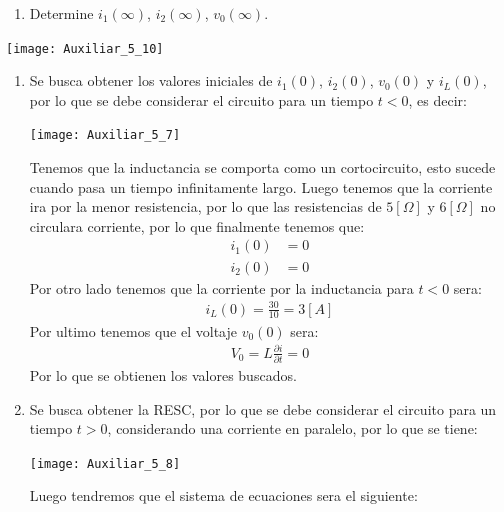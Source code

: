 \documentclass[
  11pt,
  letterpaper,
   addpoints,
   answers
  ]{exam}
\begin{document}
\begin{questions}
\begin{enumerate}
    \item Determine \( i_1(\infty) \), \( i_2(\infty) \), \( v_0(\infty) \).
\end{enumerate}
\begin{center}
    \texttt{[image: Auxiliar\_5\_10]}
\end{center}
\begin{solution}
    \begin{enumerate}
        \item Se busca obtener los valores iniciales de $i_{1}(0)$, $i_{2}(0)$, $v_{0}(0)$ y $i_{L}(0)$, por lo que se debe considerar el circuito para un tiempo $t<0$, es decir:
        \begin{center}
            \texttt{[image: Auxiliar\_5\_7]}
        \end{center}
        Tenemos que la inductancia se comporta como un cortocircuito, esto sucede cuando pasa un tiempo infinitamente largo. Luego tenemos que la corriente ira por la menor resistencia, por lo que las resistencias de $5[\Omega]$ y $6[\Omega]$ no circulara corriente, por lo que finalmente tenemos que:
        \begin{align}
            i_{1}(0) &= 0\\
            i_{2}(0) &= 0
        \end{align}
        Por otro lado tenemos que la corriente por la inductancia para $t<0$ sera:
        \begin{align}
            i_{L}(0) = \frac{30}{10} = 3[A]
        \end{align}
        Por ultimo tenemos que el voltaje $v_{0}(0)$ sera:
        \begin{align}
            V_{0} =  L\frac{\partial i}{\partial t} = 0
        \end{align}
        Por lo que se obtienen los valores buscados.
        \item Se busca obtener la RESC, por lo que se debe considerar el circuito para un tiempo $t>0$, considerando una corriente en paralelo, por lo que se tiene:
        \begin{center}
            \texttt{[image: Auxiliar\_5\_8]}
        \end{center}
        Luego tendremos que el sistema de ecuaciones sera el siguiente:
        \begin{align}

\end{align}
\end{enumerate}
\end{solution}
\end{questions}
\end{document}
